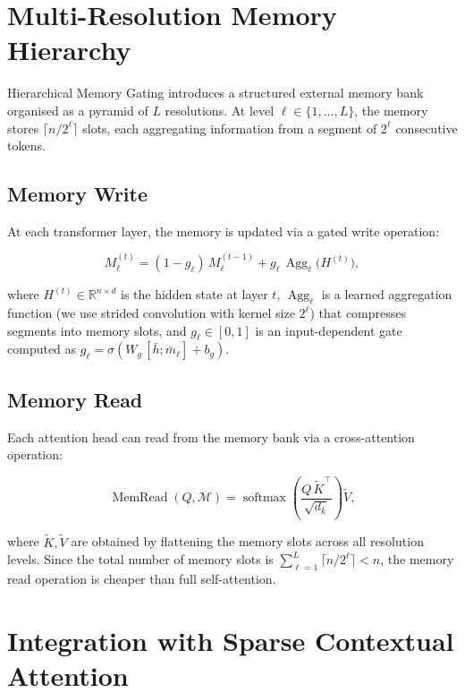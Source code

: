 \documentclass[12pt,a4paper,oneside]{book}
\begin{document}
\section{Multi-Resolution Memory Hierarchy}

Hierarchical Memory Gating introduces a structured external memory bank organised as a
pyramid of $L$ resolutions. At level $\ell \in \{1, \dots, L\}$, the memory stores
$\lceil n / 2^{\ell} \rceil$ slots, each aggregating information from a segment of
$2^{\ell}$ consecutive tokens.

\subsection{Memory Write}

At each transformer layer, the memory is updated via a gated write operation:

\begin{equation}
  M_{\ell}^{(t)} = (1 - g_{\ell})\, M_{\ell}^{(t-1)} + g_{\ell}\,
    \operatorname{Agg}_{\ell}\!\bigl(H^{(t)}\bigr),
  \label{eq:mem-write}
\end{equation}

where $H^{(t)} \in \mathbb{R}^{n \times d}$ is the hidden state at layer $t$,
$\operatorname{Agg}_{\ell}$ is a learned aggregation function (we use strided
convolution with kernel size $2^{\ell}$) that compresses segments into memory slots,
and $g_{\ell} \in [0,1]$ is an input-dependent gate computed as
$g_{\ell} = \sigma(W_g\, [\bar{h}; \bar{m}_{\ell}] + b_g)$.

\subsection{Memory Read}

Each attention head can read from the memory bank via a cross-attention operation:

\begin{equation}
  \operatorname{MemRead}(Q, \mathcal{M}) = \operatorname{softmax}\!\left(
    \frac{Q\, \tilde{K}^{\top}}{\sqrt{d_k}}
  \right) \tilde{V},
  \label{eq:mem-read}
\end{equation}

where $\tilde{K}, \tilde{V}$ are obtained by flattening the memory slots across all
resolution levels. Since the total number of memory slots is
$\sum_{\ell=1}^{L} \lceil n / 2^{\ell} \rceil < n$, the memory read operation is
cheaper than full self-attention.

\section{Integration with Sparse Contextual Attention}
\end{document}
